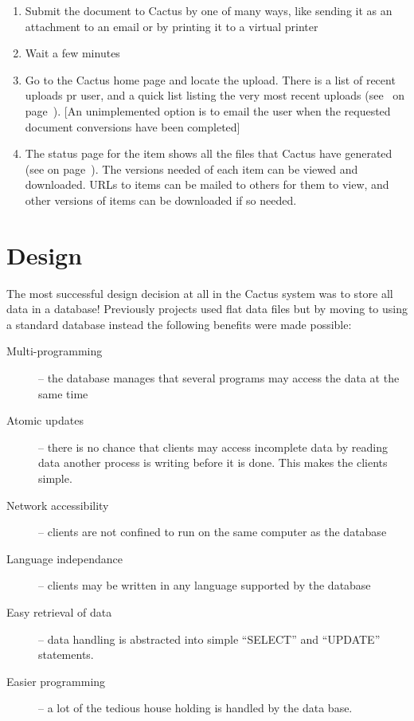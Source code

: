 \begin{enumerate}
\item Submit the document to Cactus by one of many ways,
  like sending it as an attachment to an email or by
  printing it to a virtual printer
  
\item Wait a few minutes
  
\item Go to the Cactus home page and locate the upload.  There is a
  list of recent uploads pr user, and a quick list listing the very
  most recent uploads (see~ on
  page~\pageref{tab:cactus-ten-most-recent}).  [An unimplemented
  option is to email the user when the requested document conversions
  have been completed]

\item The status page for the item shows all the files that Cactus
  have generated (see  on
  page~\pageref{tab:cactus-splitted-email-from-lars}).  The versions
  needed of each item can be viewed and downloaded.  URLs to items can
  be mailed to others for them to view, and other versions of items
  can be downloaded if so needed.
\end{enumerate}

\section{Design}
\label{sec:cactus-design}

The most successful design decision at all in the Cactus system was to
store all data in a database!  Previously projects used flat data
files but by moving to using a standard database instead the following
benefits were made possible:

\begin{description}
\item[Multi-programming] -- the database manages that several programs
  may access the data at the same time
\item[Atomic updates] --  there is no chance that clients may access
  incomplete data by reading data another process is writing before it
  is done.  This makes the clients simple.
\item[Network accessibility] -- clients are not confined to run on the
  same computer as the database
\item[Language independance] -- clients may be written in any language
  supported by the database
\item[Easy retrieval of data] -- data handling is abstracted into
   simple ``SELECT'' and ``UPDATE'' statements.
   
\item[Easier programming] -- a lot of the tedious house holding is
  handled by the data base.
\end{description}

